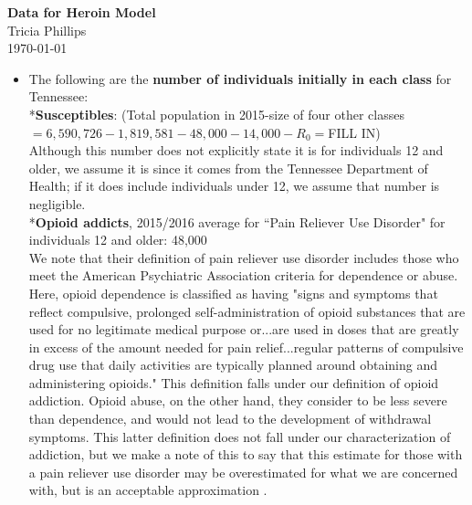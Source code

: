 \documentclass[12pt]{article}
\begin{document}
\textbf{Data for Heroin Model} \\
Tricia Phillips \\
\today \\
\begin{itemize}

\item The following are the \textbf{number of individuals initially in each class} for Tennessee: \\

*\textbf{Susceptibles}: (Total population in 2015-size of four other classes$=6,590,726-1,819,581-48,000-14,000-R_{0}=$FILL IN) \cite{USCensus} \\

Although this number does not explicitly state it is for individuals 12 and older, we assume it is since it comes from the Tennessee Department of Health; if it does include individuals under 12, we assume that number is negligible. \\

*\textbf{Opioid addicts}, 2015/2016 average for ``Pain Reliever Use Disorder" for individuals 12 and older: 48,000 \cite{NSDUH2} \\
We note that their definition of pain reliever use disorder includes those who meet the American Psychiatric Association criteria for dependence or abuse. Here, opioid dependence is classified as having "signs and symptoms that reflect compulsive, prolonged self-administration of opioid substances that are used for no legitimate medical purpose or...are used in doses that are greatly in excess of the amount needed for pain relief...regular patterns of compulsive drug use that daily activities are typically planned around obtaining and administering opioids." This definition falls under our definition of opioid addiction. Opioid abuse, on the other hand, they consider to be less severe than dependence, and would not lead to the development of withdrawal symptoms. This latter definition does not fall under our characterization of addiction, but we make a note of this to say that this estimate for those with a pain reliever use disorder may be overestimated for what we are concerned with, but is an acceptable approximation  \cite{DSM}.\\


\end{itemize}
\end{document}
